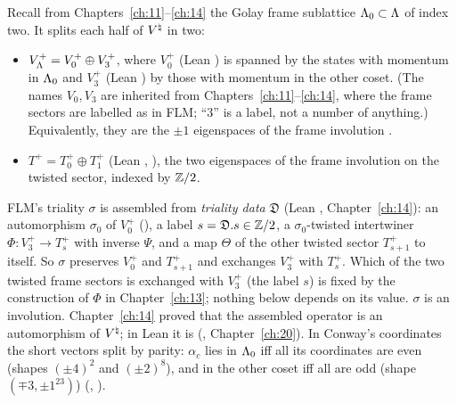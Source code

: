 Recall from Chapters~\ref{ch:11}--\ref{ch:14} the Golay frame sublattice ${\Lambda}_0\subset{\Lambda}$ of index two.  It splits
each half of ${V^{\natural}}$ in two:
\begin{itemize}
\item $V_{\Lambda}^+=V_0^+\oplus V_3^+$, where $V_0^+$ (Lean ) is spanned by the states with momentum in
  ${\Lambda}_0$ and $V_3^+$ (Lean ) by those with momentum in the other coset.  (The names $V_0,V_3$ are
  inherited from Chapters~\ref{ch:11}--\ref{ch:14}, where the frame sectors are labelled as in FLM; ``3'' is a label, not
  a number of anything.)  Equivalently, they are the $\pm1$ eigenspaces of the frame involution .
\item $T^+=T_0^+\oplus T_1^+$ (Lean , ), the two eigenspaces of the frame involution on the
  twisted sector, indexed by ${\mathbb{Z}}/2$.
\end{itemize}
FLM's triality $\sigma$ is assembled from \emph{triality data} $\mathfrak D$ (Lean , Chapter~\ref{ch:14}):
an automorphism $\sigma_0$ of $V_0^+$ (), a label $s=\mathfrak D.s\in{\mathbb{Z}}/2$, a $\sigma_0$-twisted intertwiner
$\Phi:V_3^+\to T_s^+$ with inverse $\Psi$, and a map $\Theta$ of the other twisted sector $T_{s+1}^+$ to itself.  So $\sigma$
preserves $V_0^+$ and $T_{s+1}^+$ and exchanges $V_3^+$ with $T_s^+$.  Which of the two twisted frame sectors is exchanged
with $V_3^+$ (the label $s$) is fixed by the construction of $\Phi$ in Chapter~\ref{ch:13}; nothing below depends on its
value.  $\sigma$ is an involution.  Chapter~\ref{ch:14} proved that the assembled operator is an
automorphism of ${V^{\natural}}$; in Lean it is  (,
Chapter~\ref{ch:20}).  In Conway's coordinates the short vectors split by parity: $\alpha_c$ lies in ${\Lambda}_0$ iff all its
coordinates are even (shapes $(\pm4)^2$ and $(\pm2)^8$), and in the other coset iff all are odd (shape
$(\mp3,\pm1^{23})$) (, ).

